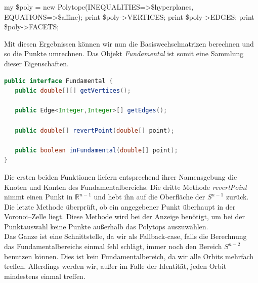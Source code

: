          \begin{code}
my \$poly = new Polytope(INEQUALITIES=>\$hyperplanes, EQUATIONS=>\$affine);
print \$poly->VERTICES;
print \$poly->EDGES;
print \$poly->FACETS;
         \end{code}

         \noindent Mit diesen Ergebnissen können wir nun die Basiswechselmatrizen berechnen und so die Punkte umrechnen. Das Objekt \emph{Fundamental} ist somit
         eine Sammlung dieser Eigenschaften.
         
\begin{lstlisting}[language=Java, caption={Auswahl aus dem Fundamental Interface}, label=fund:interface]
public interface Fundamental {
   public double[][] getVertices();
               
   public Edge<Integer,Integer>[] getEdges();

   public double[] revertPoint(double[] point);

   public boolean inFundamental(double[] point);
}
\end{lstlisting}
         
         \noindent Die ersten beiden Funktionen liefern entsprechend ihrer Namensgebung die Knoten und Kanten des Fundamentalbereichs. Die dritte Methode \emph{revertPoint} nimmt einen Punkt in $\mathbb{R}^{n-1}$ und
         hebt ihn auf die Oberfläche der $S^{n-1}$ zurück. Die letzte Methode überprüft, ob ein angegebener Punkt überhaupt in der Voronoi--Zelle liegt.
         Diese Methode wird bei der Anzeige benötigt, um bei der Punktauswahl keine Punkte außerhalb das Polytops auszuwählen.\\

         \noindent Das Ganze ist eine Schnittstelle, da wir als Fallback-case, falls die Berechnung das Fundamentalbereichs einmal fehl schlägt, immer noch 
         den Bereich $S^{n-2}$ benutzen können. Dies ist kein Fundamentalbereich, da wir alle Orbits mehrfach treffen. Allerdings werden wir, außer im Falle
         der Identität, jeden Orbit mindestens einmal treffen.


